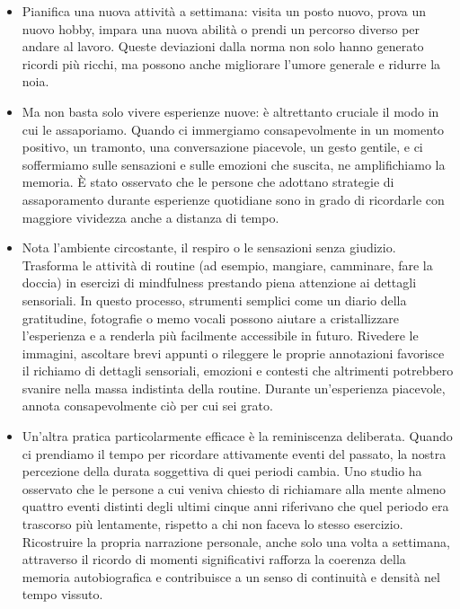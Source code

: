 \documentclass[12pt]{book} %
\begin{document}
\begin{itemize}
\item Pianifica una nuova attività a settimana: visita un posto nuovo, prova un nuovo hobby, impara una nuova abilità o prendi un percorso diverso per andare al lavoro. Queste deviazioni dalla norma non solo hanno generato ricordi più ricchi, ma possono anche migliorare l’umore generale e ridurre la noia.
\item Ma non basta solo vivere esperienze nuove: è altrettanto cruciale il modo in cui le assaporiamo. Quando ci immergiamo consapevolmente in un momento positivo, un tramonto, una conversazione piacevole, un gesto gentile, e ci soffermiamo sulle sensazioni e sulle emozioni che suscita, ne amplifichiamo la memoria. È stato osservato che le persone che adottano strategie di assaporamento durante esperienze quotidiane sono in grado di ricordarle con maggiore vividezza anche a distanza di tempo. 
\item Nota l'ambiente circostante, il respiro o le sensazioni senza giudizio. Trasforma le attività di routine (ad esempio, mangiare, camminare, fare la doccia) in esercizi di mindfulness prestando piena attenzione ai dettagli sensoriali. In questo processo, strumenti semplici come un diario della gratitudine, fotografie o memo vocali possono aiutare a cristallizzare l’esperienza e a renderla più facilmente accessibile in futuro. Rivedere le immagini, ascoltare brevi appunti o rileggere le proprie annotazioni favorisce il richiamo di dettagli sensoriali, emozioni e contesti che altrimenti potrebbero svanire nella massa indistinta della routine. Durante un'esperienza piacevole, annota consapevolmente ciò per cui sei grato.
\item Un’altra pratica particolarmente efficace è la reminiscenza deliberata. Quando ci prendiamo il tempo per ricordare attivamente eventi del passato, la nostra percezione della durata soggettiva di quei periodi cambia. Uno studio ha osservato che le persone a cui veniva chiesto di richiamare alla mente almeno quattro eventi distinti degli ultimi cinque anni riferivano che quel periodo era trascorso più lentamente, rispetto a chi non faceva lo stesso esercizio. Ricostruire la propria narrazione personale, anche solo una volta a settimana, attraverso il ricordo di momenti significativi rafforza la coerenza della memoria autobiografica e contribuisce a un senso di continuità e densità nel tempo vissuto.

\end{itemize}
\end{document}
